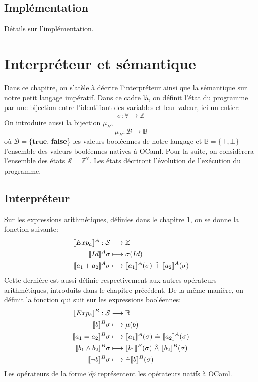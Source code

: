 \documentclass[a4paper, 12pt]{article}
\begin{document}
\begin{center}\end{center}

\subsection{Implémentation}
Détails sur l'implémentation.

\section{Interpréteur et sémantique}
Dans ce chapitre, on s'atèle à décrire l'interpréteur ainsi que la sémantique sur notre petit langage impératif. 
Dans ce cadre là, on définit l'état du programme par une bijection entre l'identifiant des variables et leur valeur, 
ici un entier:
\[\sigma : \mathbb{V} \longrightarrow \mathbb{Z}\]
On introduire aussi la bijection $\mu_B$,
\[\mu_B : \mathcal{B} \longrightarrow \mathbb{B}\]
où $\mathcal{B} = \{\textbf{true}$, \textbf{false}\} les valeurs booléennes de notre langage et $\mathbb{B} = \{\top, \bot\}$ 
l'ensemble des valeurs booléennes natives à OCaml. Pour la suite, on considèrera l'ensemble des états $\mathcal{S} = \mathbb{Z}^\mathbb{V}$.
Les états décriront l'évolution de l'exécution du programme.

\subsection{Interpréteur}
Sur les expressions arithmétiques, définies dans le chapitre 1, on se donne la fonction suivante:
\begin{align*}
	\intrfun{Exp_a}{A}:\mathcal{S}&\longrightarrow\mathbb{Z}\\
	\intrfun{Id}{A}\sigma&\longmapsto\sigma(Id)\\
	\intrfun{a_1+a_2}{A}\sigma&\longmapsto\intr{a_1}{A}{\sigma}\text{ }\hat{+}\text{ }\intr{a_2}{A}{\sigma}\\
\end{align*}
Cette dernière est aussi définie respectivement aux autres opérateurs arithmétiques, introduits dans le chapitre précédent.
De la même manière, on définit la fonction qui suit sur les expressions booléennes:
\begin{align*}
	\intrfun{Exp_b}{B}:\mathcal{S}&\longrightarrow\mathbb{B}\\	
	\intrfun{b}{B}\sigma&\longmapsto\mu(b)\\
	\intrfun{a_1=a_2}{B}\sigma &\longmapsto \intr{a_1}{A}{\sigma}\text{ }\hat{=}\text{ }\intr{a_2}{A}{\sigma}\\
	\intrfun{b_1\wedge b_2}{B}\sigma&\longmapsto \intr{b_1}{B}{\sigma}\text{ }\hat{\wedge}\text{ }\intr{b_2}{B}{\sigma}\\
	\intrfun{\neg b}{B}\sigma&\longmapsto\hat{\neg}\intr{b}{B}{\sigma}
\end{align*}
Les opérateurs de la forme $\hat{op}$ représentent les opérateurs natifs à OCaml.
\end{document}
